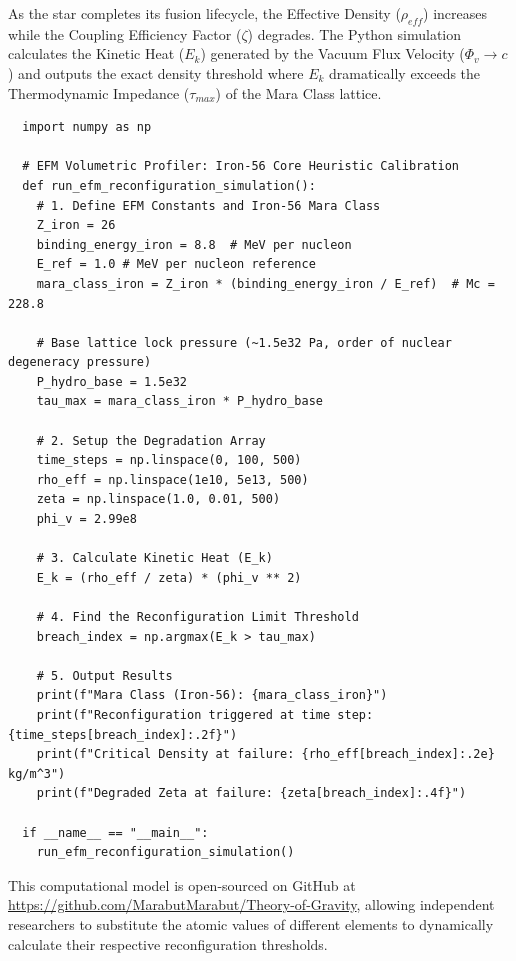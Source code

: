 \documentclass[11pt, a4paper]{article}
\begin{document}
  As the star completes its fusion lifecycle, the Effective Density ($\rho_{eff}$) increases while the Coupling Efficiency Factor ($\zeta$) degrades. The Python simulation calculates the Kinetic Heat ($E_k$) generated by the Vacuum Flux Velocity ($\Phi_v \to c$) and outputs the exact density threshold where $E_k$ dramatically exceeds the Thermodynamic Impedance ($\tau_{max}$) of the Mara Class lattice.

  \begin{verbatim}
  import numpy as np

  # EFM Volumetric Profiler: Iron-56 Core Heuristic Calibration
  def run_efm_reconfiguration_simulation():
    # 1. Define EFM Constants and Iron-56 Mara Class
    Z_iron = 26
    binding_energy_iron = 8.8  # MeV per nucleon
    E_ref = 1.0 # MeV per nucleon reference
    mara_class_iron = Z_iron * (binding_energy_iron / E_ref)  # Mc = 228.8
    
    # Base lattice lock pressure (~1.5e32 Pa, order of nuclear degeneracy pressure)
    P_hydro_base = 1.5e32 
    tau_max = mara_class_iron * P_hydro_base
    
    # 2. Setup the Degradation Array
    time_steps = np.linspace(0, 100, 500)
    rho_eff = np.linspace(1e10, 5e13, 500)
    zeta = np.linspace(1.0, 0.01, 500)
    phi_v = 2.99e8  
    
    # 3. Calculate Kinetic Heat (E_k)
    E_k = (rho_eff / zeta) * (phi_v ** 2)
    
    # 4. Find the Reconfiguration Limit Threshold
    breach_index = np.argmax(E_k > tau_max)
    
    # 5. Output Results
    print(f"Mara Class (Iron-56): {mara_class_iron}")
    print(f"Reconfiguration triggered at time step: {time_steps[breach_index]:.2f}")
    print(f"Critical Density at failure: {rho_eff[breach_index]:.2e} kg/m^3")
    print(f"Degraded Zeta at failure: {zeta[breach_index]:.4f}")

  if __name__ == "__main__":
    run_efm_reconfiguration_simulation()
  \end{verbatim}

  This computational model is open-sourced on GitHub at \url{https://github.com/MarabutMarabut/Theory-of-Gravity}, allowing independent researchers to substitute the atomic values of different elements to dynamically calculate their respective reconfiguration thresholds.
  
\end{document}
